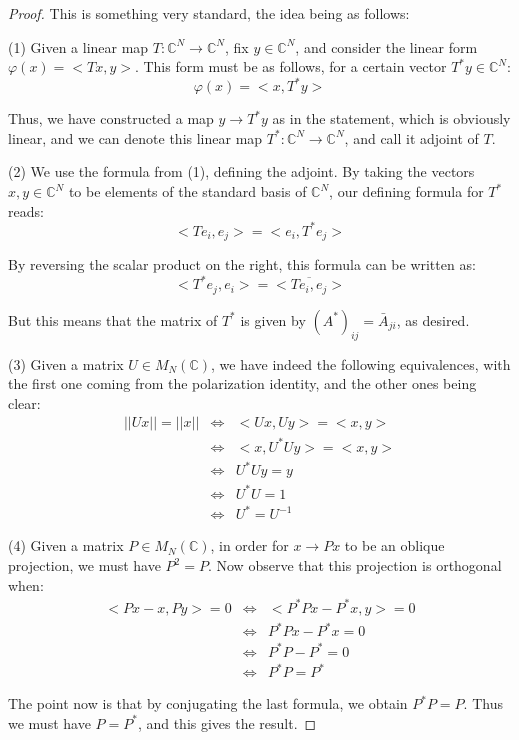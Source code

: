\documentclass[12pt]{amsbook}
\begin{document}
\begin{proof}
This is something very standard, the idea being as follows:

\medskip

(1) Given a linear map $T:\mathbb C^N\to\mathbb C^N$, fix $y\in\mathbb C^N$, and consider the linear form $\varphi(x)=<Tx,y>$. This form must be as follows, for a certain vector $T^*y\in\mathbb C^N$:
$$\varphi(x)=<x,T^*y>$$

Thus, we have constructed a map $y\to T^*y$ as in the statement, which is obviously linear, and we can denote this linear map $T^*:\mathbb C^N\to\mathbb C^N$, and call it adjoint of $T$. 

\medskip

(2) We use the formula from (1), defining the adjoint. By taking the vectors $x,y\in\mathbb C^N$ to be elements of the standard basis of $\mathbb C^N$, our defining formula for $T^*$ reads:
$$<Te_i,e_j>=<e_i,T^*e_j>$$

By reversing the scalar product on the right, this formula can be written as:
$$<T^*e_j,e_i>=\overline{<Te_i,e_j>}$$

But this means that the matrix of $T^*$ is given by $(A^*)_{ij}=\bar{A}_{ji}$, as desired.

\medskip

(3) Given a matrix $U\in M_N(\mathbb C)$, we have indeed the following equivalences, with the first one coming from the polarization identity, and the other ones being clear:
\begin{eqnarray*}
||Ux||=||x||
&\iff&<Ux,Uy>=<x,y>\\
&\iff&<x,U^*Uy>=<x,y>\\
&\iff&U^*Uy=y\\
&\iff&U^*U=1\\
&\iff&U^*=U^{-1}
\end{eqnarray*}

(4) Given a matrix $P\in M_N(\mathbb C)$, in order for $x\to Px$ to be an oblique projection, we must have $P^2=P$. Now observe that this projection is orthogonal when:
\begin{eqnarray*}
<Px-x,Py>=0
&\iff&<P^*Px-P^*x,y>=0\\
&\iff&P^*Px-P^*x=0\\
&\iff&P^*P-P^*=0\\
&\iff&P^*P=P^*
\end{eqnarray*}

The point now is that by conjugating the last formula, we obtain $P^*P=P$. Thus we must have $P=P^*$, and this gives the result. 
\end{proof}
\end{document}
